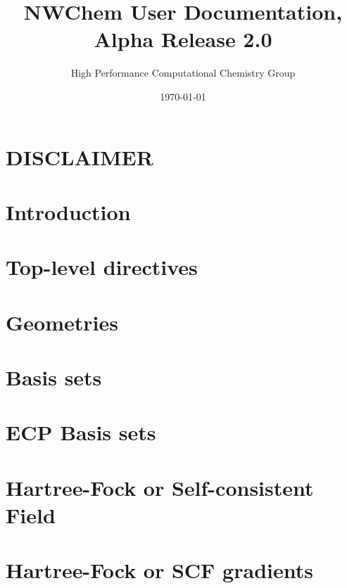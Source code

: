 \setlength{\parskip}{6pt}

\newcommand{\nwchemversion}{2.0}
\newcommand{\nwchemyear}{1996}



\title{\bf\Large NWChem User Documentation, Alpha Release \nwchemversion}
\author{High Performance Computational Chemistry Group}
\date{\today}
\maketitle

\section*{\center DISCLAIMER}


\clearpage

\tableofcontents

\clearpage

\section{Introduction}


\section{Top-level directives}


\section{Geometries}


\section{Basis sets}


\section{ECP Basis sets}


\section{Hartree-Fock or Self-consistent Field} 


\section{Hartree-Fock or SCF gradients}


